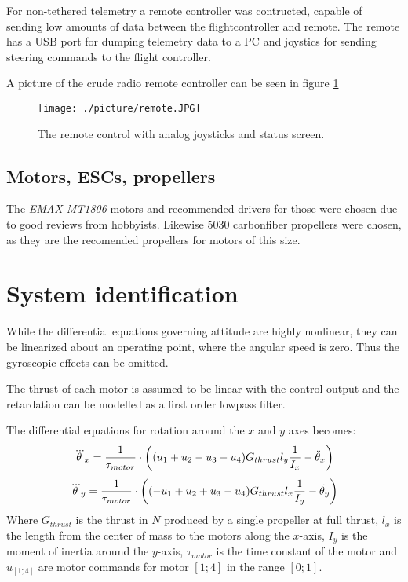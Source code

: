 For non-tethered telemetry a remote controller was contructed, capable of
sending low amounts of data between the flightcontroller and remote. The remote
has a USB port for dumping telemetry data to a PC and joystics for sending
steering commands to the flight controller.

A picture of the crude radio remote controller can be seen in figure
\ref{fig:remote}

\begin{figure}
	\centering
	\texttt{[image: ./picture/remote.JPG]}
	\caption{The remote control with analog joysticks and status screen.}
	\label{fig:remote}
\end{figure}

\subsection{ Motors, ESCs, propellers }
The \emph{EMAX MT1806} motors
and recommended drivers for those were chosen due to good reviews from
hobbyists. Likewise 5030 carbonfiber propellers were chosen, as they are the
recomended propellers for motors of this size.

\section{ System identification } %
While the differential equations governing attitude are highly nonlinear,
they can be linearized about an operating point, where the angular speed is zero.
Thus the gyroscopic effects can be omitted.

The thrust of each motor is assumed to be linear with the control output and the
retardation can be modelled as a first order lowpass filter.

The differential equations for rotation around the $x$ and $y$ axes
becomes:
\begin{equation}
 \dddot\theta_x = \frac{1}{\tau_{motor}} \cdot \left(
 (u_1 + u_2 - u_3 - u_4) G_{thrust} l_{y} \frac{ 1 }{ I_{x} }  - \ddot\theta_x
 \right) 
\end{equation}
\begin{equation}
 \dddot\theta_y = \frac{1}{\tau_{motor}} \cdot \left(
 (-u_1 + u_2 + u_3 - u_4) G_{thrust} l_{x} \frac{ 1 }{ I_{y} }  - \ddot\theta_y
 \right) 
\end{equation}
Where $G_{thrust}$ is the thrust in $N$ produced by a single propeller at full
thrust, $l_{x}$ is the length from the center of mass to the motors along the
$x$-axis, $I_{y}$ is the moment of inertia around the $y$-axis,
$\tau_{motor}$ is the time constant of the motor and $u_{[1;4]}$ are motor
commands for motor $[1;4]$ in the range $[0;1]$.

